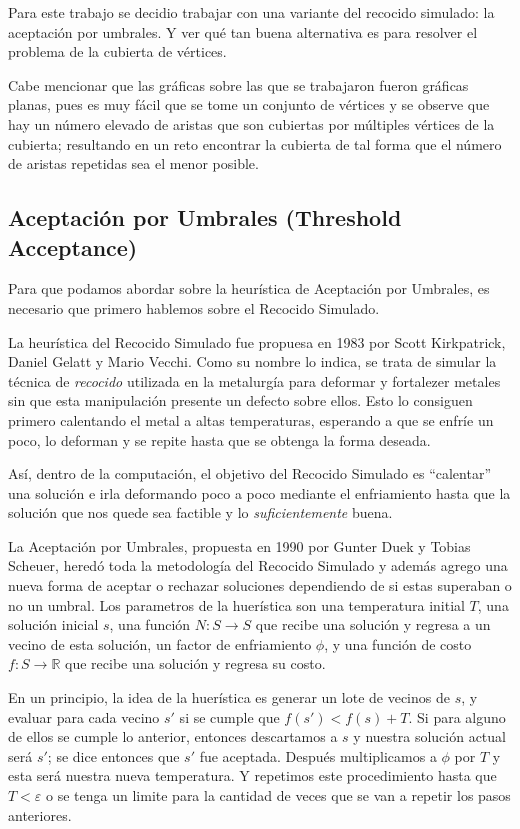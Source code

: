 \documentclass{article}
\newcommand{\tit}[1]{\textit{#1}}
\begin{document}
  Para este trabajo se decidio trabajar con una variante del 
  recocido simulado: la aceptación por umbrales. Y ver qué tan
  buena alternativa es para resolver el problema de la cubierta
  de vértices. 

  Cabe mencionar que las gráficas sobre las que se trabajaron fueron 
  gráficas planas, pues es muy fácil que se tome un conjunto de vértices
  y se observe que hay un número elevado de aristas que son cubiertas por 
  múltiples vértices de la cubierta; resultando en un reto encontrar 
  la cubierta de tal forma que el número de aristas repetidas sea el 
  menor posible.

  \subsection{Aceptación por Umbrales (Threshold Acceptance)}
  Para que podamos abordar sobre la heurística de Aceptación por Umbrales,
  es necesario que primero hablemos sobre el Recocido Simulado.

  La heurística del Recocido Simulado fue propuesa en 1983 por
  Scott Kirkpatrick, Daniel Gelatt y Mario Vecchi. Como su nombre
  lo indica, se trata de simular la técnica de \tit{recocido}
  utilizada en la metalurgía para deformar y fortalezer metales sin 
  que esta manipulación presente un defecto sobre ellos. Esto lo 
  consiguen primero calentando el metal a altas temperaturas,
  esperando a que se enfríe un poco, lo deforman y se repite hasta
  que se obtenga la forma deseada.

  Así, dentro de la computación, el objetivo del Recocido Simulado
  es ``calentar'' una solución e irla deformando poco a poco 
  mediante el enfriamiento hasta que la solución que nos quede 
  sea factible y lo \tit{suficientemente} buena.

  La Aceptación por Umbrales, propuesta en 1990 por Gunter Duek y
  Tobias Scheuer, heredó toda la metodología del Recocido
  Simulado y además agrego una nueva forma de aceptar o rechazar
  soluciones dependiendo de si estas superaban o no un umbral.
  Los parametros de la huerística son una temperatura initial $T$,
  una solución inicial $s$, una función $N: S \rightarrow S$ que
  recibe una solución y regresa a un vecino de esta solución, 
  un factor de enfriamiento $\phi$, y una función de costo 
  $f: S \rightarrow \mathbb{R}$ que recibe una solución y regresa
  su costo.

  En un principio, la idea de la huerística es generar un lote 
  de vecinos de $s$, y evaluar para cada vecino $s'$ si se 
  cumple que $f(s') < f(s) + T$. Si para alguno de ellos se cumple
  lo anterior, entonces descartamos a $s$ y nuestra solución actual 
  será $s'$; se dice entonces que $s'$ fue aceptada. Después
  multiplicamos a $\phi$ por $T$ y esta será nuestra nueva 
  temperatura. Y repetimos este procedimiento hasta que 
  $T < \varepsilon$ o se tenga un limite para la cantidad de veces 
  que se van a repetir los pasos anteriores.
\end{document}
